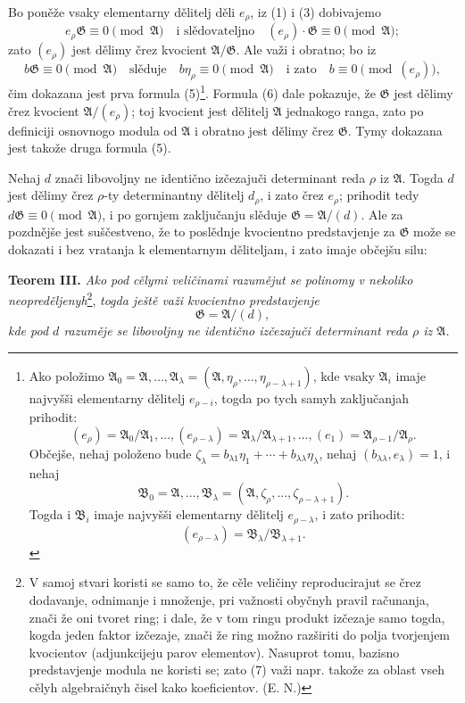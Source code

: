 \documentclass[11pt]{article}
\providecommand{\Amod}{\mathfrak A}
\providecommand{\Bmod}{\mathfrak B}
\providecommand{\Gmod}{\mathfrak G}
\providecommand{\zero}[1]{\equiv 0\pmod{#1}}
\begin{document}
Bo poněže vsaky elementarny dělitelj děli $e_\rho$, iz (1) i (3) dobivajemo
\begin{equation}
 e_\rho\Gmod\zero{\Amod}\quad \text{i slědovateljno}\quad (e_\rho)\cdot\Gmod\zero{\Amod};
\tag{6}
\end{equation}
zato $(e_\rho)$ jest dělimy črez kvocient $\Amod/\Gmod$. Ale važi i obratno; bo iz
\[
 b\Gmod\zero{\Amod}
 \quad\text{slěduje}\quad b\eta_\rho\zero{\Amod}
 \quad\text{i zato}\quad b\zero{(e_\rho)},
\]
čim dokazana jest prva formula (5)\footnote{Ako položimo $\Amod_0=\Amod,\ldots,\Amod_\lambda=(\Amod,\eta_\rho,\ldots,\eta_{\rho-\lambda+1})$, kde vsaky $\Amod_i$ imaje najvyšši elementarny dělitelj $e_{\rho-i}$, togda po tych samyh zaključanjah prihodit:
\[
 (e_\rho)=\Amod_0/\Amod_1,\ldots,(e_{\rho-\lambda})=\Amod_\lambda/\Amod_{\lambda+1},\ldots,(e_1)=\Amod_{\rho-1}/\Amod_\rho.
\]
Občejše, nehaj položeno bude $\zeta_\lambda=b_{\lambda1}\eta_1+\cdots+b_{\lambda\lambda}\eta_\lambda$, nehaj $(b_{\lambda\lambda},e_\lambda)=1$, i nehaj
\[
 \Bmod_0=\Amod,\ldots,\Bmod_\lambda=(\Amod,\zeta_\rho,\ldots,\zeta_{\rho-\lambda+1}).
\]
Togda i $\Bmod_i$ imaje najvyšši elementarny dělitelj $e_{\rho-\lambda}$, i zato prihodit:
\[
 (e_{\rho-\lambda})=\Bmod_\lambda/\Bmod_{\lambda+1}.
\]}. Formula (6) dale pokazuje, že $\Gmod$ jest dělimy črez kvocient $\Amod/(e_\rho)$; toj kvocient jest dělitelj $\Amod$ jednakogo ranga, zato po definiciji osnovnogo modula od $\Amod$ i obratno jest dělimy črez $\Gmod$. Tymy dokazana jest takože druga formula (5).

Nehaj $d$ znači libovoljny ne identično izčezajuči determinant reda $\rho$ iz $\Amod$. Togda $d$ jest dělimy črez $\rho$-ty determinantny dělitelj $d_\rho$, i zato črez $e_\rho$; prihodit tedy $d\Gmod\zero{\Amod}$, i po gornjem zaključanju slěduje $\Gmod=\Amod/(d)$. Ale za pozdnějše jest suščestveno, že to poslědnje kvocientno predstavjenje za $\Gmod$ može se dokazati i bez vratanja k elementarnym děliteljam, i zato imaje občejšu silu:

\medskip
\noindent\textbf{Teorem III.} \emph{Ako pod cělymi veličinami razumějut se polinomy v nekoliko neopreděljenyh}\footnote{V samoj stvari koristi se samo to, že cěle veličiny reproducirajut se črez dodavanje, odnimanje i množenje, pri važnosti obyčnyh pravil računanja, znači že oni tvoret ring; i dale, že v tom ringu produkt izčezaje samo togda, kogda jeden faktor izčezaje, znači že ring možno razširiti do polja tvorjenjem kvocientov (adjunkcijeju parov elementov). Nasuprot tomu, bazisno predstavjenje modula ne koristi se; zato (7) važi napr. takože za oblast vseh cělyh algebraičnyh čisel kako koeficientov. (E. N.)}, \emph{togda ještě važi kvocientno predstavjenje}
\begin{equation}
 \Gmod=\Amod/(d),
\tag{7}
\end{equation}
\emph{kde pod $d$ razuměje se libovoljny ne identično izčezajuči determinant reda $\rho$ iz $\Amod$.}
\end{document}
